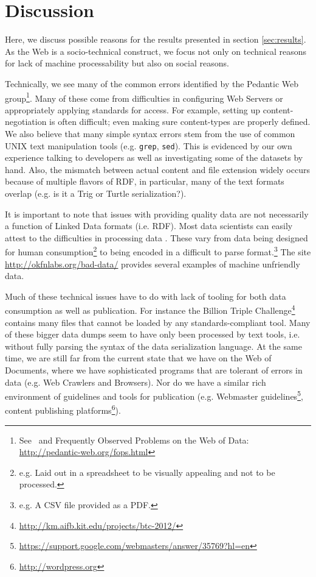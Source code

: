 \section{Discussion}
\label{sec:discussion}

Here, we discuss possible reasons for the results presented
 in section \ref{sec:results}.
As the Web is a socio-technical construct,
 we focus not only on technical reasons for lack of machine processability
 but also on social reasons.

Technically, we see many of the common errors identified by
 the Pedantic Web group\footnote{See~\cite{conf/www/HoganHPDP10} and
   Frequently Observed Problems on the Web of Data: \url{http://pedantic-web.org/fops.html}}.
Many of these come from difficulties in configuring Web Servers
 or appropriately applying standards for access.
For example, setting up content-negotiation is often difficult;
 even making sure content-types are properly defined.
We also believe that many simple syntax errors stem from
 the use of common UNIX text manipulation tools
 (e.g. \texttt{grep}, \texttt{sed}).
This is evidenced by our own experience talking to developers
 as well as investigating some of the datasets by hand.
Also, the mismatch between actual content and file extension
 widely occurs because of multiple flavors of RDF, in particular,
 many of the text formats overlap (e.g. is it a Trig or Turtle serialization?).

It is important to note that issues with providing quality data
 are not necessarily a function of Linked Data formats (i.e. RDF).
Most data scientists can easily attest to the difficulties
 in processing data \cite{baddatabook}.
These vary from data being designed for human consumption\footnote{e.g.
  Laid out in a spreadsheet to be visually appealing
  and not to be processed.}
 to being encoded in a difficult to parse format.\footnote{e.g.
  A CSV file provided as a PDF.}
The site \url{http://okfnlabs.org/bad-data/} provides several examples
 of machine unfriendly data.

Much of these technical issues have to do with lack of tooling
 for both data consumption as well as publication.
For instance the Billion Triple Challenge\footnote{\url{http://km.aifb.kit.edu/projects/btc-2012/}}
 contains many files that cannot be loaded by any standards-compliant tool.
Many of these bigger data dumps seem to have only been processed
 by text tools, i.e. without fully parsing the syntax of
 the data serialization language.
At the same time, we are still far from the current state that we have
 on the Web of Documents, where we have sophisticated programs
 that are tolerant of errors in data (e.g. Web Crawlers and Browsers).
Nor do we have a similar rich environment of guidelines
 and tools for publication
 (e.g. Webmaster guidelines\footnote{\url{https://support.google.com/webmasters/answer/35769?hl=en}},
  content publishing platforms\footnote{\url{http://wordpress.org}}).

